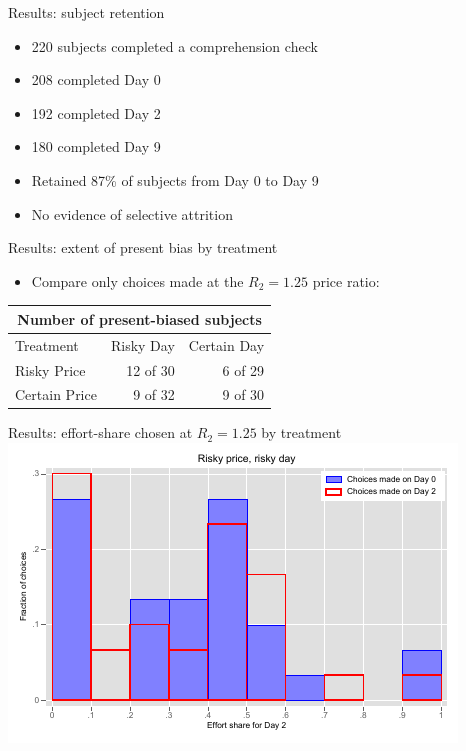 \documentclass[professionalfont,10pt]{beamer}
\begin{document}
\begin{frame}{Results: subject retention}
\begin{itemize}[<+->]
\item 220 subjects completed a comprehension check
\vspace{1\baselineskip}
\item 208 completed Day 0
\item 192 completed Day 2
\item 180 completed Day 9
\vspace{1\baselineskip}
\item Retained 87\% of subjects from Day 0 to Day 9
\vspace{1\baselineskip}
\item \alert{No evidence of selective attrition}
\end{itemize}
\end{frame}

\begin{frame}{Results: extent of present bias by treatment}
\begin{itemize}[<+->]
\item Compare only choices made at the $R_2=1.25$ price ratio:
\end{itemize}
 \begin{center}
    \begin{tabular}{lrr}
    \toprule
    \multicolumn{3}{c}{Number of present-biased subjects} \\
    \midrule
        Treatment & \hspace{1em} Risky Day & \hspace{1em} Certain Day \\
    \midrule
      Risky Price &  12 of 30 &     6 of 29 \\
    Certain Price &   9 of 32 &     9 of 30 \\
    \bottomrule
    \end{tabular}
 \end{center}
\end{frame}

\begin{frame}{Results: effort-share chosen at $R_2=1.25$ by treatment}
\includegraphics[width=\textwidth, trim=0cm 0cm 0cm 0cm, clip]{stata_graphics/effshare_hist_overlaid_rprd_3x2.pdf}
\end{frame}
\end{document}
